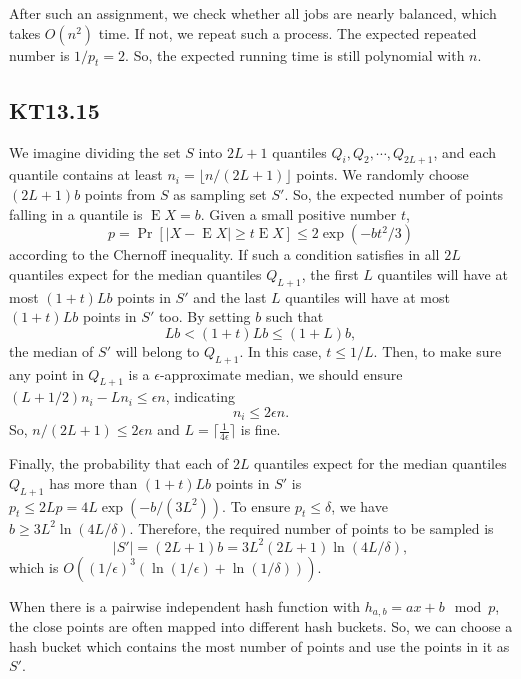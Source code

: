 \documentclass[12pt,onecolumn,a4paper]{article}
\DeclareMathOperator{\E}{E}
\begin{document}
After such an assignment, we check whether all jobs are nearly balanced, which takes $O(n^2)$ time. If not, we repeat such a process. The expected repeated number is $1/p_t=2$. So, the expected running time is still polynomial with $n$.


\subsection*{KT13.15}
We imagine dividing the set $S$ into $2L+1$ quantiles $Q_i,Q_2,\cdots,Q_{2L+1}$, and each quantile contains at least $n_i=\lfloor n/(2L+1)\rfloor$ points. We randomly choose $(2L+1)b$ points from $S$ as sampling set $S'$. So, the expected number of points falling in a quantile is $\E X=b$. Given a small positive number $t$, $$p=\Pr[|X-\E X|\ge t\E X]\le 2\exp(-bt^2/3)$$ according to the Chernoff inequality. If such a condition satisfies in all $2L$ quantiles expect for the median quantiles $Q_{L+1}$, the first $L$ quantiles will have at most $(1+t)Lb$ points in $S'$ and the last $L$ quantiles will have at most $(1+t)Lb$ points in $S'$ too. By setting $b$ such that $$Lb<(1+t)Lb\le(1+L)b,$$
the median of $S'$ will belong to $Q_{L+1}$. In this case, $t\le 1/L$. Then, to make sure any point in $Q_{L+1}$ is a $\epsilon$-approximate median, we should ensure $(L+1/2)n_i-Ln_i\le \epsilon n$, indicating $$n_i\le 2\epsilon n.$$ 
So, $n/(2L+1)\le 2\epsilon n$ and $L=\lceil\frac{1}{4\epsilon}\rceil$ is fine. 

Finally, the probability that each of $2L$ quantiles expect for the median quantiles $Q_{L+1}$ has more than $(1+t)Lb$ points in $S'$ is $p_t\le 2Lp=4L\exp(-b/(3L^2))$. To ensure $p_t\le \delta$, we have $b\ge 3L^2\ln(4L/\delta)$. Therefore, the required number of points to be sampled is $$|S'|=(2L+1)b=3L^2(2L+1)\ln(4L/\delta),$$
which is $O((1/\epsilon)^3(\ln(1/\epsilon)+\ln(1/\delta)))$.

When there is a pairwise independent hash function with $h_{a,b}=ax+b\mod p$, the close points are often mapped into different hash buckets. So, we can choose a hash bucket which contains the most number of points and use the points in it as $S'$.
\end{document}
